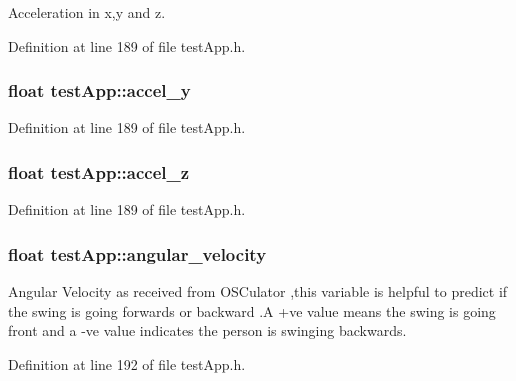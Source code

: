 Acceleration in x,y and z. 



Definition at line 189 of file test\-App.\-h.

\hypertarget{group___wii_mote_variables_ga204bcb2412a70a65ebea6008ee8c4eb0}{
\subsubsection[{accel\-\_\-y}]{\setlength{\rightskip}{0pt plus 5cm}float test\-App\-::accel\-\_\-y}}\label{group___wii_mote_variables_ga204bcb2412a70a65ebea6008ee8c4eb0}


Definition at line 189 of file test\-App.\-h.

\hypertarget{group___wii_mote_variables_ga61dbdd5c0b868568dde40a52f6e56054}{
\subsubsection[{accel\-\_\-z}]{\setlength{\rightskip}{0pt plus 5cm}float test\-App\-::accel\-\_\-z}}\label{group___wii_mote_variables_ga61dbdd5c0b868568dde40a52f6e56054}


Definition at line 189 of file test\-App.\-h.

\hypertarget{group___wii_mote_variables_ga98e05c3206ff95fccfebfc9df5317598}{
\subsubsection[{angular\-\_\-velocity}]{\setlength{\rightskip}{0pt plus 5cm}float test\-App\-::angular\-\_\-velocity}}\label{group___wii_mote_variables_ga98e05c3206ff95fccfebfc9df5317598}


Angular Velocity as received from O\-S\-Culator ,this variable is helpful to predict if the swing is going forwards or backward .A +ve value means the swing is going front and a -\/ve value indicates the person is swinging backwards. 



Definition at line 192 of file test\-App.\-h.

